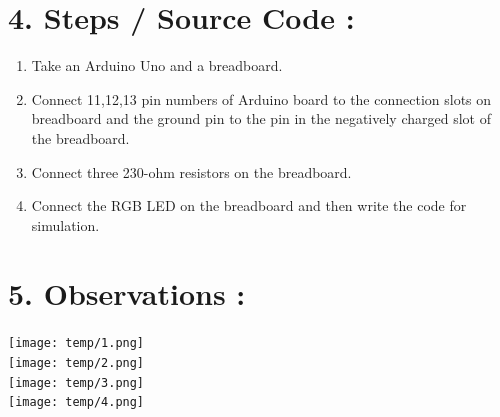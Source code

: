 \documentclass[14pt]{extarticle}
\begin{document}
\newpage
\section*{\normalsize 4. Steps / Source Code :}


\begin{enumerate}
  \item Take an Arduino Uno and a breadboard.
  \item Connect 11,12,13 pin numbers of Arduino board to the connection slots on breadboard and the ground pin to the pin in the negatively charged slot of the breadboard.
  \item Connect three 230-ohm resistors on the breadboard.
  \item Connect the RGB LED on the breadboard and then write the code for simulation.
\end{enumerate}

 

\section*{\normalsize 5. Observations :}

\texttt{[image: temp/1.png]} \\

\texttt{[image: temp/2.png]} \\

\texttt{[image: temp/3.png]} \\

\texttt{[image: temp/4.png]} \\

    




\end{document}
